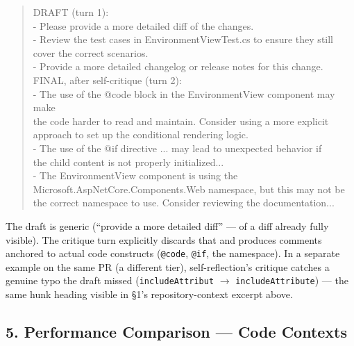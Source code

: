 \documentclass{experimentreport}
\begin{document}
{\begin{quote}
\ttfamily\footnotesize\noindent
DRAFT (turn 1):\\
- Please provide a more detailed diff of the changes.\\
- Review the test cases in EnvironmentViewTest.cs to ensure they still\\
\hspace*{1.0em}  cover the correct scenarios.\\
- Provide a more detailed changelog or release notes for this change.\\[0.4em]
FINAL, after self-critique (turn 2):\\
- The use of the @code block in the EnvironmentView component may make\\
\hspace*{1.0em}  the code harder to read and maintain. Consider using a more explicit\\
\hspace*{1.0em}  approach to set up the conditional rendering logic.\\
- The use of the @if directive ... may lead to unexpected behavior if\\
\hspace*{1.0em}  the child content is not properly initialized...\\
- The EnvironmentView component is using the\\
\hspace*{1.0em}  Microsoft.AspNetCore.Components.Web namespace, but this may not be\\
\hspace*{1.0em}  the correct namespace to use. Consider reviewing the documentation...
\end{quote}

\noindent The draft is generic (``provide a more detailed diff'' --- of a diff already fully
visible). The critique turn explicitly discards that and produces comments anchored to actual code
constructs (\texttt{@code}, \texttt{@if}, the namespace). In a separate example on the same PR (a
different tier), self-reflection's critique catches a genuine typo the draft missed
(\texttt{includeAttribut} $\rightarrow$ \texttt{includeAttribute}) --- the same hunk heading visible
in \S1's repository-context excerpt above.

\subsection*{5. Performance Comparison --- Code Contexts}

}
\end{document}
